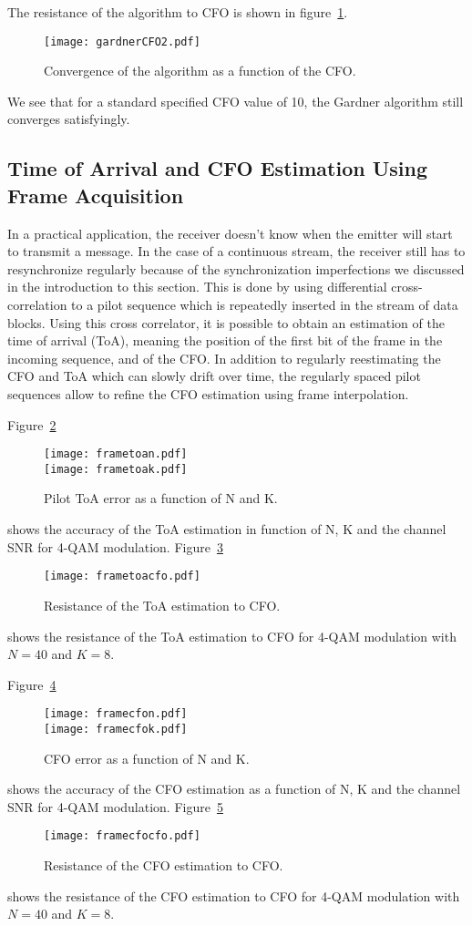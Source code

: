 The resistance of the algorithm to CFO is shown in figure~\ref{fig:gConvCFO}.
\begin{figure}[htbp]
    \centering
    \texttt{[image: gardnerCFO2.pdf]}
    \caption{Convergence of the algorithm as a function of the CFO.\label{fig:gConvCFO}}
\end{figure}
We see that for a standard specified CFO value of \SI{10}{\ppm}, the Gardner algorithm still converges satisfyingly.

\subsection{Time of Arrival and CFO Estimation Using Frame Acquisition}
In a practical application, the receiver doesn't know when the emitter will start to transmit a message.
In the case of a continuous stream, the receiver still has to resynchronize regularly because of the synchronization imperfections we discussed in the introduction to this section.
This is done by using differential cross-correlation to a pilot sequence which is repeatedly inserted in the stream of data blocks.
Using this cross correlator, it is possible to obtain an estimation of the time of arrival (ToA), meaning the position of the first bit of the frame in the incoming sequence, and of the CFO.
In addition to regularly reestimating the CFO and ToA which can slowly drift over time, the regularly spaced pilot sequences allow to refine the CFO estimation using frame interpolation.

Figure~\ref{fig:frametoa}
\begin{figure}
  \centering
  \texttt{[image: frametoan.pdf]}
  \\\texttt{[image: frametoak.pdf]}
  \caption{Pilot ToA error as a function of N and K.\label{fig:frametoa}}
\end{figure}
shows the accuracy of the ToA estimation in function of N, K and the channel SNR for 4-QAM modulation.
Figure~\ref{fig:frametoacfo}
\begin{figure}
  \centering
  \texttt{[image: frametoacfo.pdf]}
  \caption{Resistance of the ToA estimation to CFO.\label{fig:frametoacfo}}
\end{figure}
shows the resistance of the ToA estimation to CFO for 4-QAM modulation with $N = 40$ and $K=8$.

Figure~\ref{fig:framecfo}
\begin{figure}
  \centering
  \texttt{[image: framecfon.pdf]}
  \\\texttt{[image: framecfok.pdf]}
  \caption{CFO error as a function of N and K.\label{fig:framecfo}}
\end{figure}
shows the accuracy of the CFO estimation as a function of N, K and the channel SNR for 4-QAM modulation.
Figure~\ref{fig:framecfocfo}
\begin{figure}
  \centering
  \texttt{[image: framecfocfo.pdf]}
  \caption{Resistance of the CFO estimation to CFO.\label{fig:framecfocfo}}
\end{figure}
shows the resistance of the CFO estimation to CFO for 4-QAM modulation with $N = 40$ and $K=8$.

